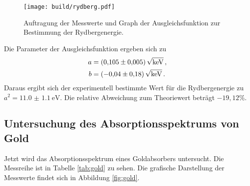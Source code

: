 \begin{figure}
  \centering
  \texttt{[image: build/rydberg.pdf]}
  \caption{Auftragung der Messwerte und Graph der Ausgleichsfunktion zur Bestimmung der Rydbergenergie.}
  \label{fig:rydberg}
\end{figure}

Die Parameter der Ausgleichsfunktion ergeben sich zu
\begin{align*}
  a &= \SI{0.105(5)}{\sqrt{\kilo\eV}} \,,\\
  b &= \SI{-0.04(18)}{\sqrt{\kilo\eV}}\,.
\end{align*}
Daraus ergibt sich der experimentell bestimmte Wert für die Rydbergenergie zu
$a^2 = \SI{11.0(11)}{\eV}$. Die relative Abweichung zum Theoriewert beträgt $-19{,}12\%$.

\subsection{Untersuchung des Absorptionsspektrums von Gold}
\label{subsec:gold}

Jetzt wird das Absorptionsspektrum eines Goldabsorbers untersucht.
Die Messreihe ist in Tabelle \ref{tab:gold} zu sehen. Die grafische Darstellung der Messwerte
findet sich in Abbildung \ref{fig:gold}.

